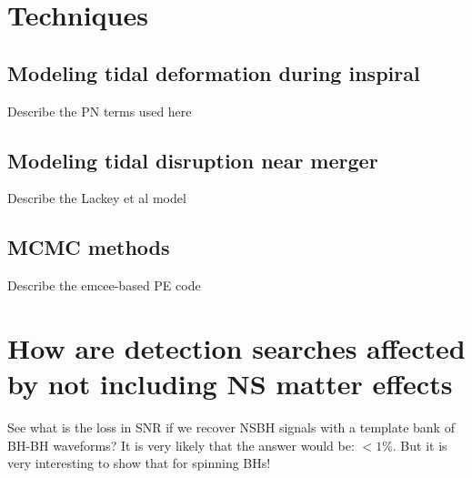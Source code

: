\documentclass[aps,prd,amsmath,floats,floatfix, twocolumn,
superscriptaddress,nofootinbib,showpacs]{revtex4-1}
\begin{document}
\section{Techniques}
\subsection{Modeling tidal deformation during inspiral}
Describe the PN terms used here

\subsection{Modeling tidal disruption near merger}
Describe the Lackey et al model

\subsection{MCMC methods}
Describe the emcee-based PE code

\section{How are detection searches affected by not including NS matter effects}
See what is the loss in SNR if we recover NSBH signals with a template bank of
BH-BH waveforms? It is very likely that the answer would be: $<1\%$. But it
is very interesting to show that for spinning BHs!

\end{document}
